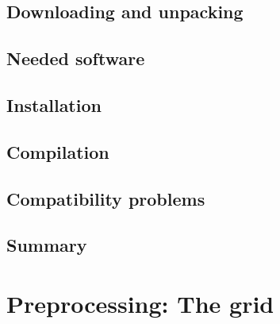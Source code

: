 \documentclass{report}
\newcommand{\todo}[1]{This section still has to be written by #1}
\begin{document}
	\section{Downloading and unpacking}
	

	\section{Needed software}
	

	\section{Installation}
	

	\section{Compilation}
	

	\section{Compatibility problems}
	

	\section{Summary}
	


\chapter{Preprocessing: The grid}



\end{document}
